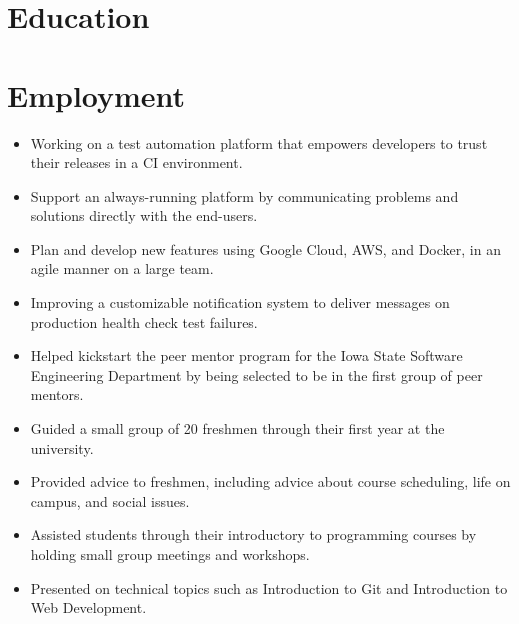 \documentclass[10pt,a4paper,sans]{moderncv}
\begin{document}
\makecvtitle
\vspace*{-5mm}
\section{Education}

%

%

\section{Employment}
{\begin{itemize}
    \item Working on a test automation platform that empowers developers to trust their releases in a CI environment.
    \item Support an always-running platform by communicating problems and solutions directly with the end-users.
    \item Plan and develop new features using Google Cloud, AWS, and Docker, in an agile manner on a large team.
    \item Improving a customizable notification system to deliver messages on production health check test failures.
\end{itemize}}
{\begin{itemize}
    \item Helped kickstart the peer mentor program for the Iowa State Software Engineering Department by being selected to be in the first group of peer mentors.
    \item Guided a small group of 20 freshmen through their first year at the university.
    \item Provided advice to freshmen, including advice about course scheduling, life on campus, and social issues.
    \item Assisted students through their introductory to programming courses by holding small group meetings and workshops.
    \item Presented on technical topics such as Introduction to Git and Introduction to Web Development.
  \end{itemize}}
\end{document}
